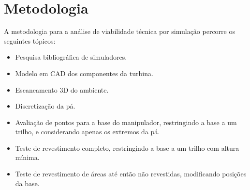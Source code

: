 \section{Metodologia}\label{metodologia}

A metodologia para a análise de viabilidade técnica por simulação percorre os
seguintes tópicos:

\begin{itemize}
  \item Pesquisa bibliográfica de simuladores.
  \item Modelo em CAD dos componentes da turbina.
  \item Escaneamento 3D do ambiente.  
  \item Discretização da pá.
  \item Avaliação de pontos para a base do manipulador, restringindo a base a um
  trilho, e considerando apenas os extremos da pá.
  \item Teste de revestimento completo, restringindo a base a um trilho com
  altura mínima.
  \item Teste de revestimento de áreas até então não revestidas,
  modificando posições da base.
\end{itemize}
